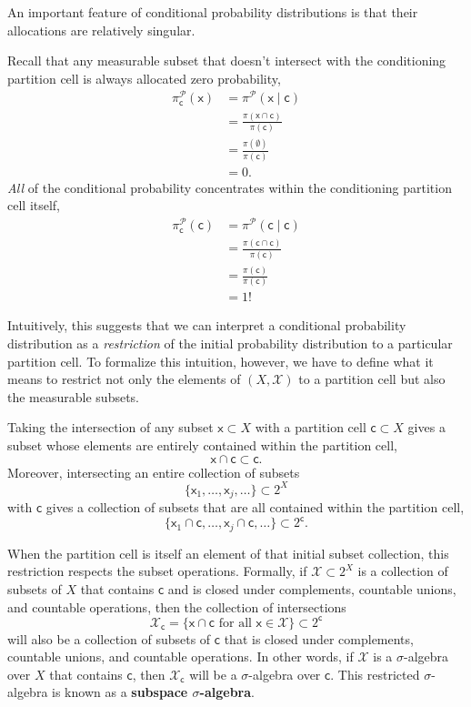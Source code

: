 \documentclass[
  letterpaper,
  DIV=11,
  numbers=noendperiod]{scrartcl}
\begin{document}
An important feature of conditional probability distributions is that
their allocations are relatively singular.

Recall that any measurable subset that doesn't intersect with the
conditioning partition cell is always allocated zero probability,
\begin{align*}
\pi^{\mathcal{P}}_{\mathsf{c}}( \mathsf{x} )
&=
\pi^{\mathcal{P}}( \mathsf{x} \mid \mathsf{c} )
\\
&=
\frac{ \pi(\mathsf{x} \cap \mathsf{c}) }{ \pi(\mathsf{c}) }
\\
&=
\frac{ \pi(\emptyset) }{ \pi(\mathsf{c}) }
\\
&=
0.
\end{align*} \emph{All} of the conditional probability concentrates
within the conditioning partition cell itself, \begin{align*}
\pi^{\mathcal{P}}_{\mathsf{c}}( \mathsf{c} )
&=
\pi^{\mathcal{P}}( \mathsf{c} \mid \mathsf{c} )
\\
&=
\frac{ \pi(\mathsf{c} \cap \mathsf{c}) }{ \pi(\mathsf{c}) }
\\
&=
\frac{ \pi(\mathsf{c}) }{ \pi(\mathsf{c}) }
\\
&=
1!
\end{align*}

Intuitively, this suggests that we can interpret a conditional
probability distribution as a \emph{restriction} of the initial
probability distribution to a particular partition cell. To formalize
this intuition, however, we have to define what it means to restrict not
only the elements of \((X, \mathcal{X})\) to a partition cell but also
the measurable subsets.

Taking the intersection of any subset \(\mathsf{x} \subset X\) with a
partition cell \(\mathsf{c} \subset X\) gives a subset whose elements
are entirely contained within the partition cell, \[
\mathsf{x} \cap \mathsf{c} \subset \mathsf{c}.
\] Moreover, intersecting an entire collection of subsets \[
\{ \mathsf{x}_{1}, \ldots, \mathsf{x}_{j}, \ldots \}
\subset
2^{X}
\] with \(\mathsf{c}\) gives a collection of subsets that are all
contained within the partition cell, \[
\{
   \mathsf{x}_{1} \cap \mathsf{c}, \ldots,
   \mathsf{x}_{j} \cap \mathsf{c}, \ldots
\}
\subset
2^{\mathsf{c}}.
\]

When the partition cell is itself an element of that initial subset
collection, this restriction respects the subset operations. Formally,
if \(\mathcal{X} \subset 2^{X}\) is a collection of subsets of \(X\)
that contains \(\mathsf{c}\) and is closed under complements, countable
unions, and countable operations, then the collection of intersections
\[
\mathcal{X}_{\mathsf{c}}
=
\{
  \mathsf{x} \cap \mathsf{c} \text{ for all }
   \mathsf{x} \in \mathcal{X}
\}
\subset
2^{\mathsf{c}}
\] will also be a collection of subsets of \(\mathsf{c}\) that is closed
under complements, countable unions, and countable operations. In other
words, if \(\mathcal{X}\) is a \(\sigma\)-algebra over \(X\) that
contains \(\mathsf{c}\), then \(\mathcal{X}_{\mathsf{c}}\) will be a
\(\sigma\)-algebra over \(\mathsf{c}\). This restricted
\(\sigma\)-algebra is known as a \textbf{subspace \(\sigma\)-algebra}.
\end{document}
